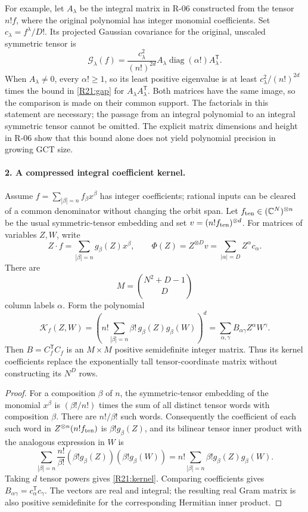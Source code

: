 \documentclass[11pt,a4paper]{article}
\theoremstyle{definition}\newtheorem{definition}{Definition}
\begin{document}
For example, let $A_\lambda$ be the integral matrix in R-06 constructed
from the tensor $n!f$, where the original polynomial has integer monomial
coefficients. Set $c_\lambda=f^\lambda/D!$. Its projected Gaussian
covariance for the original, unscaled symmetric tensor is
\begin{equation}\label{R21:gaussiantransport}
 \mathcal G_\lambda(f)=
 \frac{c_\lambda^2}{(n!)^{2d}}
 A_\lambda\operatorname{diag}(\alpha!)A_\lambda^{\mathsf T}.
\end{equation}
When $A_\lambda\ne0$, every $\alpha!\geq1$, so its least positive eigenvalue is at least
$c_\lambda^2/(n!)^{2d}$ times the bound in \eqref{R21:gap} for
$A_\lambda A_\lambda^{\mathsf T}$. Both matrices have the same image,
so the comparison is made on their common support. The factorials in
this statement are necessary; the passage from an integral polynomial
to an integral symmetric tensor cannot be omitted.
The explicit matrix dimensions and height in R-06 show that this
bound alone does not yield polynomial precision in growing GCT size.

\paragraph{2. A compressed integral coefficient kernel.}
Assume $f=\sum_{|\beta|=n}f_\beta x^\beta$ has integer coefficients;
rational inputs can be cleared of a common denominator without changing
the orbit span. Let $f_{\rm ten}\in(\mathbb C^N)^{\otimes n}$ be the
usual symmetric-tensor embedding and set
$v=(n!f_{\rm ten})^{\otimes d}$.
For matrices of variables $Z,W$, write
\[
 Z\cdot f=\sum_{|\beta|=n}g_\beta(Z)x^\beta,
 \qquad
 \Phi(Z)=Z^{\otimes D}v=\sum_{|\alpha|=D}Z^\alpha c_\alpha.
\]
There are
\[
 M=\binom{N^2+D-1}{D}
\]
column labels $\alpha$. Form the polynomial
\begin{equation}\label{R21:kernel}
 \mathcal K_f(Z,W)=
 \left(n!\sum_{|\beta|=n}\beta!\,
                     g_\beta(Z)g_\beta(W)\right)^d
       =\sum_{\alpha,\gamma}B_{\alpha\gamma}Z^\alpha W^\gamma.
\end{equation}
Then $B=C_f^{\mathsf T}C_f$ is an $M\times M$ positive semidefinite
integer matrix. Thus its kernel coefficients replace the exponentially
tall tensor-coordinate matrix without constructing its $N^D$ rows.

\begin{proof}
For a composition $\beta$ of $n$, the symmetric-tensor embedding of
the monomial $x^\beta$ is
$(\beta!/n!)$ times the sum of all distinct tensor words with
composition $\beta$. There are $n!/\beta!$ such words.
Consequently the coefficient of each such word in
$Z^{\otimes n}(n!f_{\rm ten})$ is $\beta!g_\beta(Z)$, and its
bilinear tensor inner product with the analogous expression in $W$ is
\[
 \sum_{|\beta|=n}\frac{n!}{\beta!}
                 (\beta!g_\beta(Z))(\beta!g_\beta(W))
 =n!\sum_{|\beta|=n}\beta!g_\beta(Z)g_\beta(W).
\]
Taking $d$ tensor powers gives \eqref{R21:kernel}. Comparing coefficients
gives $B_{\alpha\gamma}=c_\alpha^{\mathsf T}c_\gamma$.
The vectors are real and integral; the resulting real Gram matrix is
also positive semidefinite for the corresponding Hermitian inner product.
\end{proof}
\end{document}
